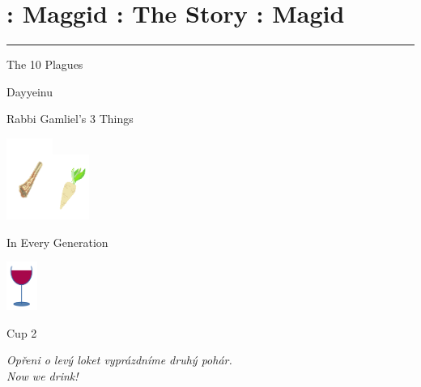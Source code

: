 \documentclass[a5paper,10pt]{memoir}
\begin{document}
\section{	 : Maggid : The Story : Magid}
\MaggidIntro
\vspace*{10ex}
{\color{cyan} \rule{\linewidth}{0.5mm}}
\onecolumn
\begin{center}
	\noindent \large \color{midblue} The 10 Plagues \centering
\end{center}
\Plagues
\onecolumn
\begin{center}
	\noindent \large \color{midblue} Dayyeinu
\end{center}
\Dayyeinu
\begin{center}
	\noindent \large \color{midblue} Rabbi Gamliel's 3 Things
\end{center}

\vspace*{-10ex}
\hfill\includegraphics[width=15mm]{Zeroa}\includegraphics[width=12mm]{Maror}
\vspace*{-10ex}  %

\Gamliel
\vspace*{2ex}
\begin{center}
	\noindent \large \color{midblue} In Every Generation
\end{center}
\EveryGeneration

\vspace*{2ex}
\hfill\includegraphics[width=10mm]{cup}
\vspace*{-15ex}  %

\begin{center}
	\noindent \large \color{midblue} Cup 2
\end{center}
\Kaddeish
\textit{Opřeni o levý loket vyprázdníme druhý pohár. \\ \color{midblue}Now we drink!}
\onecolumn
\end{document}
